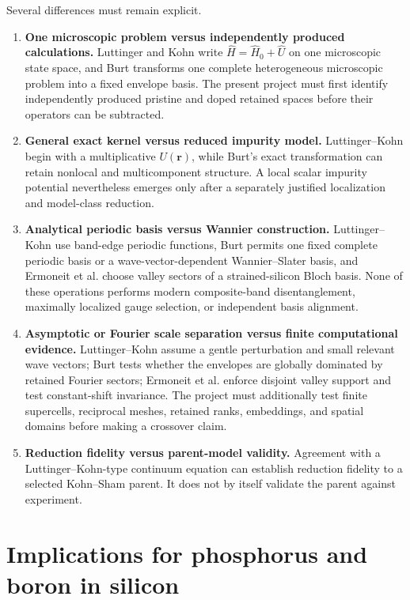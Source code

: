 Several differences must remain explicit.

\begin{enumerate}
  \item \textbf{One microscopic problem versus independently produced
    calculations.} Luttinger and Kohn write $\hat H=\hat H_0+\hat U$ on one
    microscopic state space, and Burt transforms one complete heterogeneous
    microscopic problem into a fixed envelope basis. The present project must
    first identify independently produced pristine and doped retained spaces
    before their operators can be subtracted.
  \item \textbf{General exact kernel versus reduced impurity model.}
    Luttinger--Kohn begin with a multiplicative $U(\mathbf r)$, while Burt's
    exact transformation can retain nonlocal and multicomponent structure. A
    local scalar impurity potential nevertheless emerges only after a separately
    justified localization and model-class reduction.
  \item \textbf{Analytical periodic basis versus Wannier construction.}
    Luttinger--Kohn use band-edge periodic functions, Burt permits one fixed
    complete periodic basis or a wave-vector-dependent Wannier--Slater basis,
    and Ermoneit et al. choose valley sectors of a strained-silicon Bloch basis.
    None of these operations performs modern composite-band disentanglement,
    maximally localized gauge selection, or independent basis alignment.
  \item \textbf{Asymptotic or Fourier scale separation versus finite
    computational evidence.} Luttinger--Kohn assume a gentle perturbation and
    small relevant wave vectors; Burt tests whether the envelopes are globally
    dominated by retained Fourier sectors; Ermoneit et al. enforce disjoint
    valley support and test constant-shift invariance. The project must
    additionally test finite supercells, reciprocal meshes, retained ranks,
    embeddings, and spatial domains before making a crossover claim.
  \item \textbf{Reduction fidelity versus parent-model validity.} Agreement
    with a Luttinger--Kohn-type continuum equation can establish reduction
    fidelity to a selected Kohn--Sham parent. It does not by itself validate the
    parent against experiment.
\end{enumerate}

\section{Implications for phosphorus and boron in silicon}

